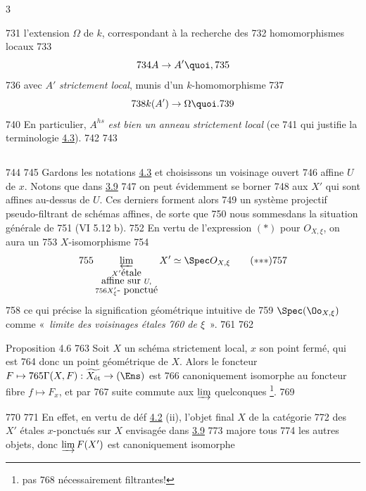 3	\documentclass[10pt]{../fichiers-configuration-latex/smfart}
\begin{document}
   731	l'extension $\Omega$ de $k$, correspondant à la recherche des
   732	homomorphismes locaux
   733	$$
   734	A \to A'{\quoi},
   735	$$
   736	avec $A'$ \emph{strictement local}, munis d'un $k$-homomorphisme
   737	$$
   738	k(A') \to \Omega{\quoi}.
   739	$$
   740	En particulier, $A^{hs}$  \emph{est bien un anneau strictement local} (ce
   741	qui justifie la terminologie \hyperref[VIII.def4.3]{4.3}).
   742	
   743	\subsection{}
   744	
   745	Gardons les notations  \hyperref[VIII.def4.3]{4.3} et choisissons un voisinage ouvert
   746	affine $U$ de $x$. Notons que dans \hyperref[VIII.prop3.9]{3.9}
   747	on peut évidemment se borner
   748	aux $X'$ qui sont affines au-dessus de $U$. Ces derniers forment alors
   749	un système projectif pseudo-filtrant de schémas affines, de sorte que
   750	nous sommes\pageoriginale dans la situation générale de 
   751	(\cf  VI 5.12 b). %
   752	En vertu de l'expression $(\ast)$ pour $O_{X, \xi}$, on aura un
   753	$X$-isomorphisme
   754	\begin{equation*}
   755	\varprojlim_{\substack{X' \mbox{\rm étale}\\ \mbox{affine sur } U,\\
   756	X'_{\xi}\mbox{\rm - ponctué}}} X'\simeq \Spec O_{X, \xi}\tag{${\ast}{\ast}{\ast}$}
   757	\end{equation*}
   758	ce qui précise la signification géométrique intuitive de
   759	$\Spec(\Oo_{X, \xi})$ comme « \emph{limite des voisinages étales
   760	de $\xi$} ».
   761	
   762	\begin{enonce*}{Proposition 4.6}
   763	Soit $X$ un schéma strictement local, $x$ son point fermé, qui est
   764	donc un point géométrique de $X$. Alors le foncteur $F \mapsto
   765	\Gamma (X, F): \widetilde{X_{\text{\rm ét}}} \to (\Ens)$ est
   766	canoniquement isomorphe au foncteur fibre $f \mapsto F_x$, et par
   767	suite commute aux $\varinjlim$ quelconques \footnote{pas
   768	nécessairement filtrantes!}.
   769	\end{enonce*}
   770	
   771	En effet, en vertu de déf \hyperref[VIII.def4.2]{4.2} (ii), l'objet final $X$ de la catégorie
   772	des $X'$ étales $x$-ponctués sur $X$ envisagée dans \hyperref[VIII.prop3.9]{3.9}
   773	majore tous
   774	les autres objets, donc $\varinjlim F(X')$ est canoniquement isomorphe
\end{document}
